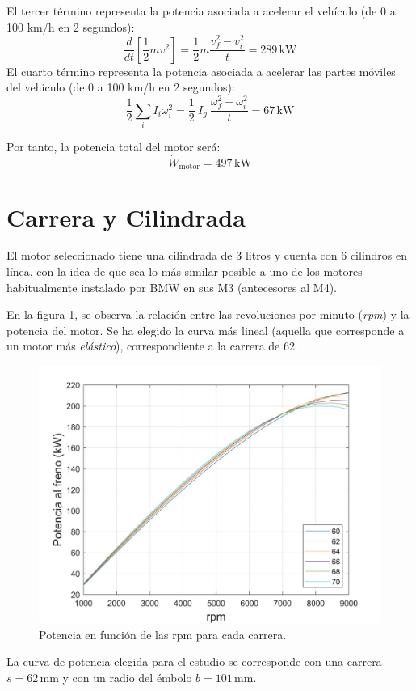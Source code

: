 El tercer término representa la potencia asociada a acelerar el vehículo (de 0 a 100 km/h en 2 segundos): %
\[
\frac{d}{dt} \left[ \frac{1}{2} m v^2 \right] =\frac{1}{2}  m  \frac{v_f^2 - v_i^2}{t} = 289 \, \text{kW}
\]
El cuarto término representa la potencia asociada a acelerar las partes móviles del vehículo (de 0 a 100 km/h en 2 segundos):
\[
\frac{1}{2} \sum_{i} I_i \omega_i^2 = \frac{1}{2} \  I_g \  \frac{\omega_f^2 - \omega_i^2}{t} = 67 \, \text{kW}
\]

Por tanto, la potencia total del motor será: \\
\[
\dot{W}_{\text{motor}} = 497 \, \text{kW}
\]

\section{Carrera y Cilindrada} \label{s:section_02}

El motor seleccionado tiene una cilindrada de 3 litros y cuenta con 6 cilindros en línea, con la idea de que sea lo más similar posible a uno de los motores habitualmente instalado por BMW en sus M3 (antecesores al M4).

En la figura \ref{fig:RPM_sb}, se observa la relación entre las revoluciones por minuto (\textit{rpm}) y la potencia del motor. Se ha elegido la curva más lineal (aquella que corresponde a un motor más \textit{elástico}), correspondiente a la carrera de 62 .

\begin{figure}[H]
    \centering
    \includegraphics[width=0.6\linewidth]{Figures/01/Potencia_rpm_sb.jpg}
    \caption{Potencia en función de las rpm para cada carrera.}
    \label{fig:RPM_sb}
\end{figure}

La curva de potencia elegida para el estudio se corresponde con una carrera \( s = 62 \, \text{mm} \) y con un radio del émbolo \( b = 101 \, \text{mm} \).

